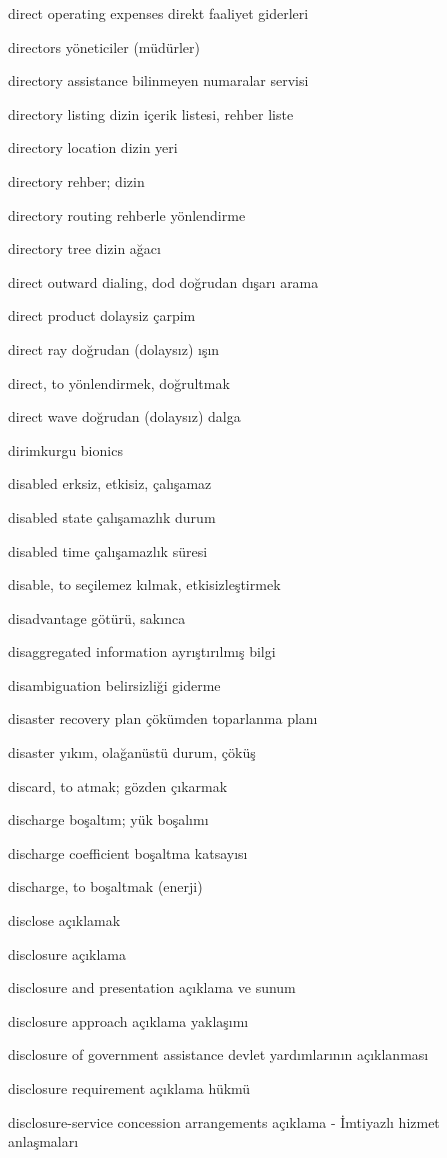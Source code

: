 \documentclass[12pt,fleqn]{article}\usepackage{../../common}
\begin{document}
direct operating expenses direkt faaliyet giderleri

directors yöneticiler (müdürler)

directory assistance bilinmeyen numaralar servisi

directory listing dizin içerik listesi, rehber liste

directory location dizin yeri

directory rehber; dizin

directory routing rehberle yönlendirme

directory tree dizin ağacı

direct outward dialing, dod doğrudan dışarı arama

direct product dolaysiz çarpim

direct ray doğrudan (dolaysız) ışın

direct, to yönlendirmek, doğrultmak

direct wave doğrudan (dolaysız) dalga

dirimkurgu bionics

disabled erksiz, etkisiz, çalışamaz

disabled state çalışamazlık durum

disabled time çalışamazlık süresi

disable, to seçilemez kılmak, etkisizleştirmek

disadvantage götürü, sakınca

disaggregated information ayrıştırılmış bilgi

disambiguation belirsizliği giderme

disaster recovery plan çökümden toparlanma planı

disaster yıkım, olağanüstü durum, çöküş

discard, to atmak; gözden çıkarmak

discharge boşaltım; yük boşalımı

discharge coefficient boşaltma katsayısı

discharge, to boşaltmak (enerji)

disclose açıklamak

disclosure açıklama

disclosure and presentation açıklama ve sunum

disclosure approach açıklama yaklaşımı

disclosure of government assistance devlet yardımlarının açıklanması

disclosure requirement açıklama hükmü

disclosure-service concession arrangements açıklama - İmtiyazlı hizmet anlaşmaları
\end{document}
